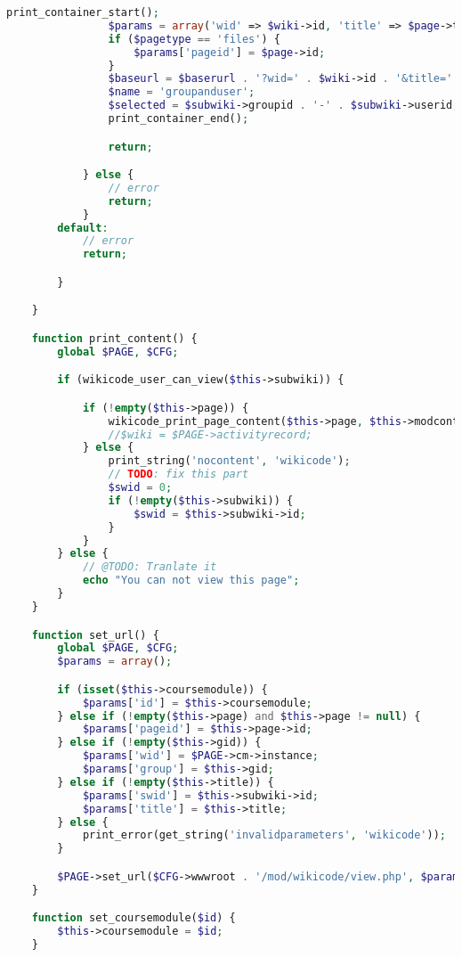 \begin{lstlisting}[language=PHP]
                print_container_start();
                $params = array('wid' => $wiki->id, 'title' => $page->title);
                if ($pagetype == 'files') {
                    $params['pageid'] = $page->id;
                }
                $baseurl = $baserurl . '?wid=' . $wiki->id . '&title=' . $page->title;
                $name = 'groupanduser';
                $selected = $subwiki->groupid . '-' . $subwiki->userid;
                print_container_end();

                return;

            } else {
                // error
                return;
            }
        default:
            // error
            return;

        }

    }

    function print_content() {
        global $PAGE, $CFG;

        if (wikicode_user_can_view($this->subwiki)) {

            if (!empty($this->page)) {
                wikicode_print_page_content($this->page, $this->modcontext, $this->subwiki->id);
                //$wiki = $PAGE->activityrecord;
            } else {
                print_string('nocontent', 'wikicode');
                // TODO: fix this part
                $swid = 0;
                if (!empty($this->subwiki)) {
                    $swid = $this->subwiki->id;
                }
            }
        } else {
            // @TODO: Tranlate it
            echo "You can not view this page";
        }
    }

    function set_url() {
        global $PAGE, $CFG;
        $params = array();

        if (isset($this->coursemodule)) {
            $params['id'] = $this->coursemodule;
        } else if (!empty($this->page) and $this->page != null) {
            $params['pageid'] = $this->page->id;
        } else if (!empty($this->gid)) {
            $params['wid'] = $PAGE->cm->instance;
            $params['group'] = $this->gid;
        } else if (!empty($this->title)) {
            $params['swid'] = $this->subwiki->id;
            $params['title'] = $this->title;
        } else {
            print_error(get_string('invalidparameters', 'wikicode'));
        }

        $PAGE->set_url($CFG->wwwroot . '/mod/wikicode/view.php', $params);
    }

    function set_coursemodule($id) {
        $this->coursemodule = $id;
    }


\end{lstlisting}
